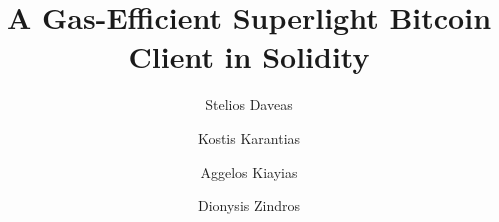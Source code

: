 \title{A Gas-Efficient Superlight Bitcoin Client in Solidity}
\ifanonymous\else
\author{
        Stelios Daveas \and
        Kostis Karantias \and
        Aggelos Kiayias \and
        Dionysis Zindros
}

\fi
